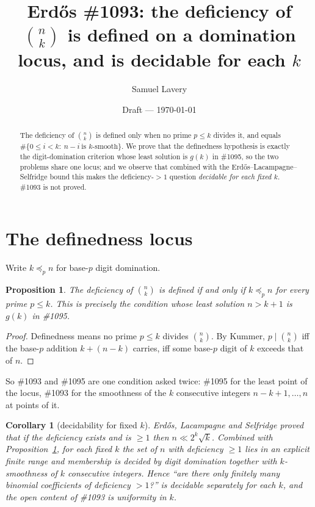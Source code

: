 \documentclass[11pt]{article}
\title{Erd\H{o}s \#1093: the deficiency of $\binom nk$ is defined on a
domination locus, and is decidable for each $k$}
\author{Samuel Lavery}
\date{Draft --- \today}
\newtheorem{proposition}[theorem]{Proposition}
\newtheorem{corollary}[theorem]{Corollary}
\begin{document}
\maketitle

\begin{abstract}
The deficiency of $\binom nk$ is defined only when no prime $p\le k$ divides it, and equals
$\#\{0\le i<k:\ n-i\ \text{is }k\text{-smooth}\}$.  We prove that the definedness hypothesis
is exactly the digit-domination criterion whose least solution is $g(k)$ in \#1095, so the
two problems share one locus; and we observe that combined with the Erd\H{o}s--Lacampagne--
Selfridge bound this makes the deficiency-$>1$ question \emph{decidable for each fixed $k$}.
\#1093 is not proved.
\end{abstract}

\section{The definedness locus}
Write $k\preceq_p n$ for base-$p$ digit domination.

\begin{proposition}\label{prop:defined}
The deficiency of $\binom nk$ is defined if and only if $k\preceq_p n$ for every prime
$p\le k$.  This is precisely the condition whose least solution $n>k+1$ is $g(k)$ in
\textup{\#1095}.
\end{proposition}

\begin{proof}
Definedness means no prime $p\le k$ divides $\binom nk$.  By Kummer, $p\mid\binom nk$ iff the
base-$p$ addition $k+(n-k)$ carries, iff some base-$p$ digit of $k$ exceeds that of $n$.
\end{proof}

So \#1093 and \#1095 are one condition asked twice: \#1095 for the least point of the locus,
\#1093 for the smoothness of the $k$ consecutive integers $n-k+1,\dots,n$ at points of it.

\begin{corollary}[decidability for fixed $k$]\label{cor:decid}
Erd\H{o}s, Lacampagne and Selfridge proved that if the deficiency exists and is $\ge1$ then
$n\ll 2^{k}\sqrt k$.  Combined with Proposition~\ref{prop:defined}, for each fixed $k$ the
set of $n$ with deficiency $\ge1$ lies in an explicit finite range and membership is decided
by digit domination together with $k$-smoothness of $k$ consecutive integers.  Hence
\textup{``are there only finitely many binomial coefficients of deficiency $>1$?''} is
decidable separately for each $k$, and the open content of \textup{\#1093} is uniformity in
$k$.
\end{corollary}
\end{document}
